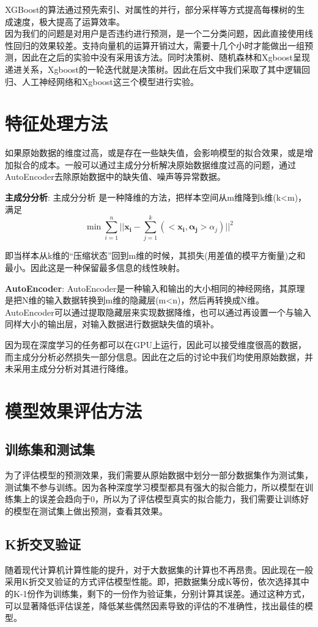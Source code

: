 XGBoost的算法通过预先索引、对属性的并行，部分采样等方式提高每棵树的生成速度，极大提高了运算效率。
\\

因为我们的问题是对用户是否违约进行预测，是一个二分类问题，因此直接使用线性回归的效果较差。支持向量机的运算开销过大，需要十几个小时才能做出一组预测，因此在之后的实验中没有采用该方法。同时决策树、随机森林和Xgboost呈现递进关系，Xgboost的一轮迭代就是决策树。因此在后文中我们采取了其中逻辑回归、人工神经网络和Xgboost这三个模型进行实验。

\section{特征处理方法}
如果原始数据的维度过高，或是存在一些缺失值，会影响模型的拟合效果，或是增加拟合的成本。一般可以通过主成分分析解决原始数据维度过高的问题，通过AutoEncoder去除原始数据中的缺失值、噪声等异常数据。

\textbf{主成分分析}:
主成分分析\cite{shlens2014pca} 是一种降维的方法，把样本空间从m维降到k维(k<m)，满足
\[
\min \sum_{i = 1}^{n} ||\bm{x_i} - \sum_{j=1}^{k}(<\bm{x_i},\bm{\alpha_j}>\alpha_j)||^2
\]

即当样本从k维的“压缩状态”回到m维的时候，其损失(用差值的模平方衡量)之和最小。因此这是一种保留最多信息的线性映射。

\textbf{AutoEncoder}:
AutoEncoder是一种输入和输出的大小相同的神经网络，其原理是把N维的输入数据转换到m维的隐藏层(m<n)，然后再转换成N维。AutoEncoder可以通过提取隐藏层来实现数据降维，也可以通过再设置一个与输入同样大小的输出层，对输入数据进行数据缺失值的填补。\cite{vincent2008autoencoder}

因为现在深度学习的任务都可以在GPU上运行，因此可以接受维度很高的数据，而主成分分析必然损失一部分信息。因此在之后的讨论中我们均使用原始数据，并未采用主成分分析对其进行降维。

\section{模型效果评估方法}
\subsection{训练集和测试集}
为了评估模型的预测效果，我们需要从原始数据中划分一部分数据集作为测试集，测试集不参与训练。因为各种深度学习模型都具有强大的拟合能力，所以模型在训练集上的误差会趋向于0，所以为了评估模型真实的拟合能力，我们需要让训练好的模型在测试集上做出预测，查看其效果。
\subsection{K折交叉验证}
随着现代计算机计算性能的提升，对于大数据集的计算也不再昂贵。因此现在一般采用K折交叉验证的方式评估模型性能。即，把数据集分成K等份，依次选择其中的K-1份作为训练集，剩下的一份作为验证集，分别计算其误差。通过这种方式，可以显著降低评估误差，降低某些偶然因素导致的评估的不准确性，找出最佳的模型。\cite[213]{james2013introduction}
